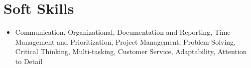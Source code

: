 \documentclass[letterpaper,11pt]{article}
\begin{document}
\section{Soft Skills}
\begin{itemize}[leftmargin=0.15in, label={}]
\item{
Communication, Organizational, Documentation and Reporting, Time Management and Prioritization, Project Management, Problem-Solving, Critical Thinking, Multi-tasking, Customer Service, Adaptability, Attention to Detail
} \\
\end{itemize}


\end{document}
